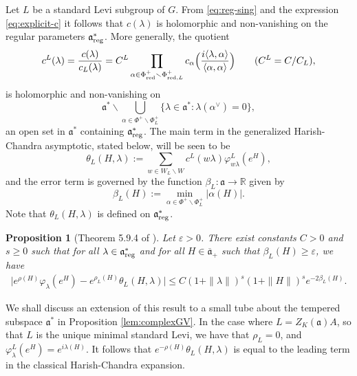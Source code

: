 \documentclass[12pt]{amsart}
\newtheorem{proposition}[theorem]{Proposition}
\theoremstyle{remark}
\newcommand{\ga}{\mathfrak a}
\begin{document}
Let $L$ be a standard Levi subgroup of $G$. From \eqref{eq:reg-sing} and the expression \eqref{eq:explicit-c} it follows that $c(\lambda)$ is holomorphic and non-vanishing on the regular parameters $\ga^*_{\rm reg}$. More generally, the quotient
\begin{equation}\label{def:cM}
c^L(\lambda)=\frac{c(\lambda)}{c_L(\lambda)}=C^L \prod_{\alpha\in\Phi_{\textnormal{red}}^+\smallsetminus\Phi^+_{\textnormal{red},L}}c_\alpha\Big(\frac{i \langle \lambda, \alpha \rangle}{\langle \alpha, \alpha \rangle}\Big)\qquad (C^L=C/C_L),
\end{equation}
is holomorphic and non-vanishing on
\begin{equation}\label{eq:cM-domain}
\ga^*\smallsetminus \bigcup_{\alpha\in\Phi^+\smallsetminus\Phi^+_L}\{\lambda\in\ga^*: \lambda(\alpha^\vee)=0\},
\end{equation}
an open set in $\ga^*$ containing $\ga^*_{\rm reg}$. The main term in the generalized Harish-Chandra asymptotic, stated below, will be seen to be
\begin{equation}\label{defn:thetaL}
    \theta_L(H, \lambda) := \sum_{w \in W_L \backslash W} c^L(w \lambda) \varphi^L_{w\lambda}(e^H),
\end{equation}
and the error term is governed by the function $\beta_L: \ga \to \mathbb{R}$ given by
\begin{equation}\label{defn:beta}
    \beta_L(H) := \min_{\alpha \in \Phi^+ \smallsetminus \Phi_L^+} |\alpha(H)|.
\end{equation}
Note that $\theta_L(H, \lambda)$ is defined on $\ga^*_{\rm reg}$.

\begin{proposition}[Theorem 5.9.4 of \cite{Gangolli_Varadarajan_88}] \label{prop_hc_expansion}
Let $\varepsilon > 0$. There exist constants $C > 0$ and $s \geq 0$ such that for all $\lambda \in \ga^*_{\textnormal{reg}}$ and for all $H \in \overline{\ga}_+$ such that $\beta_L(H) \geq \varepsilon$, we have
\begin{gather*}
    \Big| e^{\rho(H)} \varphi_\lambda(e^H) - e^{\rho_L(H)} \theta_L(H, \lambda) \Big| \leq C (1 + \|\lambda\|)^s (1 + \|H\|)^s e^{-2 \beta_L(H)}.
\end{gather*}
\end{proposition}
We shall discuss an extension of this result to a small tube about the tempered subspace $\ga^*$ in Proposition \ref{lem:complexGV}. In the case where $L = Z_{K}(\ga) A$, so that $L$ is the unique minimal standard Levi, we have that $\rho_L = 0$, and $\varphi_{\lambda}^L(e^H) = e^{i\lambda(H)}$. It follows that $e^{-\rho(H)} \theta_L(H, \lambda)$ is equal to the leading term in the classical Harish-Chandra expansion.
\end{document}
